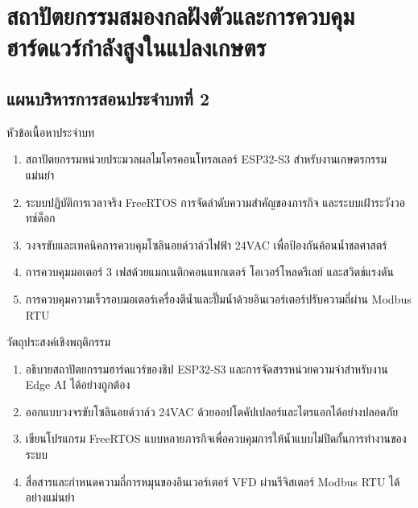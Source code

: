 \chapter{สถาปัตยกรรมสมองกลฝังตัวและการควบคุมฮาร์ดแวร์กำลังสูงในแปลงเกษตร}
\label{chap:ch02}

\section*{แผนบริหารการสอนประจำบทที่ 2}

\begin{planbox}{หัวข้อเนื้อหาประจำบท}
\begin{enumerate}[topsep=2pt, itemsep=1pt, partopsep=0pt, parsep=0pt, leftmargin=1.5em]
    \item สถาปัตยกรรมหน่วยประมวลผลไมโครคอนโทรลเลอร์ ESP32-S3 สำหรับงานเกษตรกรรมแม่นยำ
    \item ระบบปฏิบัติการเวลาจริง FreeRTOS การจัดลำดับความสำคัญของภารกิจ และระบบเฝ้าระวังวอทช์ด็อก
    \item วงจรขับและเทคนิคการควบคุมโซลินอยด์วาล์วไฟฟ้า 24VAC เพื่อป้องกันค้อนน้ำชลศาสตร์
    \item การควบคุมมอเตอร์ 3 เฟสด้วยแมกเนติกคอนแทกเตอร์ โอเวอร์โหลดรีเลย์ และสวิตช์แรงดัน
    \item การควบคุมความเร็วรอบมอเตอร์เครื่องตีน้ำและปั๊มน้ำด้วยอินเวอร์เตอร์ปรับความถี่ผ่าน Modbus RTU
\end{enumerate}
\end{planbox}

\begin{planbox}{วัตถุประสงค์เชิงพฤติกรรม}
\begin{enumerate}[topsep=2pt, itemsep=1pt, partopsep=0pt, parsep=0pt, leftmargin=1.5em]
    \item อธิบายสถาปัตยกรรมฮาร์ดแวร์ของชิป ESP32-S3 และการจัดสรรหน่วยความจำสำหรับงาน Edge AI ได้อย่างถูกต้อง
    \item ออกแบบวงจรขับโซลินอยด์วาล์ว 24VAC ด้วยออปโตคัปเปลอร์และไตรแอกได้อย่างปลอดภัย
    \item เขียนโปรแกรม FreeRTOS แบบหลายภารกิจเพื่อควบคุมการให้น้ำแบบไม่ปิดกั้นการทำงานของระบบ
    \item สื่อสารและกำหนดความถี่การหมุนของอินเวอร์เตอร์ VFD ผ่านรีจิสเตอร์ Modbus RTU ได้อย่างแม่นยำ
\end{enumerate}
\end{planbox}

\newpage

